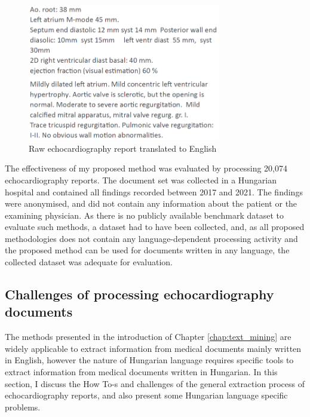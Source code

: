 \begin{figure}[h]
	\centering
        \captionsetup{justification=centering}
	\includegraphics[width=0.75\textwidth]{assets/figures/text_mining/corpus/raw_echo_example.eps}
	\caption{Raw echocardiography report translated to English}
	\label{fig:raw_echo_example}
\end{figure}

The effectiveness of my proposed method was evaluated by processing 20,074 echocardiography reports. The document set was collected in a Hungarian hospital and contained all findings recorded between 2017 and 2021. The findings were anonymised, and did not contain any information about the patient or the examining physician. As there is no publicly available benchmark dataset to evaluate such methods, a dataset had to have been collected, and, as all proposed methodologies does not contain any language-dependent processing activity and the proposed method can be used for documents written in any language, the collected dataset was adequate for evaluation.

\subsection{Challenges of processing echocardiography documents}
\label{sec:challenges}

The methods presented in the introduction of Chapter \ref{chap:text_mining} are widely applicable to extract information from medical documents mainly written in English, however the nature of Hungarian language requires specific tools to extract information from medical documents written in Hungarian. In this section, I discuss the How To-s and challenges of the general extraction process of echocardiography reports, and also present some Hungarian language specific problems.

